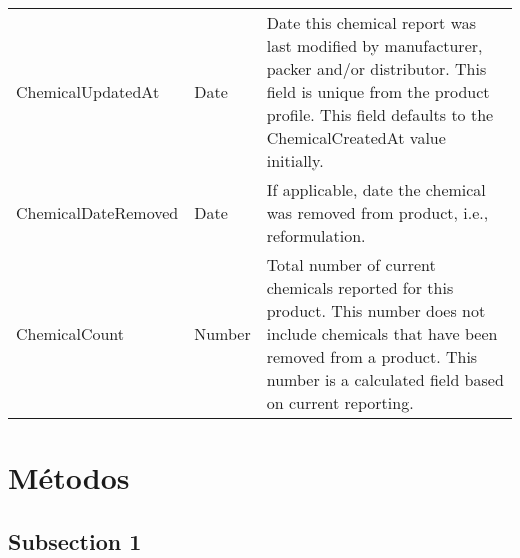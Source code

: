 \begin{table}[]
\begin{tabular}{@{}lll@{}}
ChemicalUpdatedAt      & Date       & Date this chemical report was last modified by manufacturer, packer and/or distributor. This field is unique from the product profile. This field defaults to the ChemicalCreatedAt value initially.                                                                                                                                                                                                                                                                  \\
ChemicalDateRemoved    & Date       & If applicable, date the chemical was removed from product, i.e., reformulation.                                                                                                                                                                                                                                                                                                                                                                                       \\
ChemicalCount          & Number     & Total number of current chemicals reported for this product. This number does not include chemicals that have been removed from a product. This number is a calculated field based on current reporting.                                                                                                                                                                                                                                                              \\ \bottomrule
\end{tabular}
\end{table}








\newpage

\section{Métodos}




\subsection{Subsection 1}
